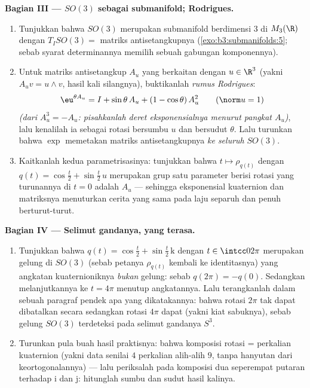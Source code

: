 \begin{problem}
\medskip
\noindent\textbf{Bagian III --- $SO(3)$ sebagai submanifold;
Rodrigues.}
\begin{enumerate}[resume]
  \item Tunjukkan bahwa $SO(3)$ merupakan submanifold 
        berdimensi $3$ di $M_3(\R)$ dengan $T_ISO(3) =$
        matriks antisetangkupnya
        (\cref{exo:b3:submanifolds:5}; sebab syarat determinannya
        memilih sebuah gabungan komponennya).
  \item Untuk matriks antisetangkup $A_u$ yang berkaitan dengan
        $u \in \R^3$ (yakni $A_uv = u\wedge v$, hasil kali
        silangnya), buktikanlah \emph{rumus Rodrigues}:
        \[
        \eu^{\theta A_u} = I + \sin\theta\,A_u + (1 -
        \cos\theta)\,A_u^2 \qquad (\norm u = 1)
        \]
        \emph{(dari $A_u^3 = -A_u$: pisahkanlah deret eksponensialnya
        menurut pangkat $A_u$)}, lalu kenalilah ia sebagai
        rotasi bersumbu $u$ dan bersudut $\theta$. Lalu turunkan bahwa
        $\exp$ memetakan matriks antisetangkupnya \emph{ke seluruh}
        $SO(3)$.
  \item Kaitkanlah kedua parametrisasinya: tunjukkan bahwa $t
        \mapsto \rho_{q(t)}$ dengan $q(t) = \cos\frac t2 +
        \sin\frac t2\,u$ merupakan grup satu parameter berisi
        rotasi yang turunannya di $t = 0$ adalah $A_u$
        --- sehingga eksponensial kuaternion dan matriksnya menuturkan
        cerita yang sama pada laju separuh dan penuh berturut-turut.
\end{enumerate}

\medskip
\noindent\textbf{Bagian IV --- Selimut gandanya, yang terasa.}
\begin{enumerate}[resume]
  \item Tunjukkan bahwa  $q(t) = \cos\frac t2 + \sin\frac
        t2\,\mathrm k$ dengan $t \in \intcc0{2\pi}$ merupakan gelung di
        $SO(3)$ (sebab petanya $\rho_{q(t)}$ kembali ke
        identitasnya) yang angkatan kuaternioniknya \emph{bukan}
        gelung: sebab $q(2\pi) = -q(0)$. Sedangkan melanjutkannya ke $t = 4\pi$
        menutup angkatannya. Lalu terangkanlah dalam sebuah paragraf pendek apa
        yang dikatakannya: bahwa rotasi $2\pi$ tak dapat dibatalkan secara 
        sedangkan rotasi $4\pi$ dapat (yakni kiat sabuknya),
        sebab gelung $SO(3)$ terdeteksi pada
        selimut gandanya $S^3$.
  \item Turunkan pula buah hasil praktisnya: bahwa komposisi
        rotasi = perkalian kuaternion
        (yakni data senilai $4$ perkalian alih-alih $9$,
        tanpa hanyutan dari keortogonalannya) --- lalu periksalah pada
        komposisi dua seperempat putaran terhadap $\mathrm i$
        dan $\mathrm j$: hitunglah sumbu dan sudut
        hasil kalinya.
\end{enumerate}


\end{problem}
